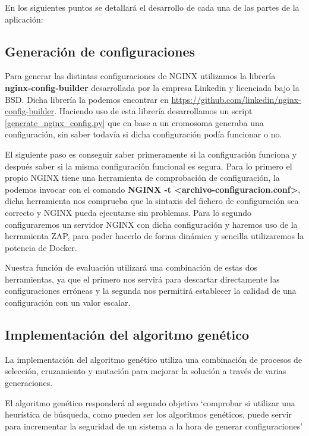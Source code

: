 En los siguientes puntos se detallará el desarrollo de cada una de las partes de la aplicación:

\subsection{Generación de configuraciones}

\bigskip
Para generar las distintas configuraciones de NGINX utilizamos la librería \textbf{nginx-config-builder} desarrollada por la empresa Linkedin y licenciada bajo la BSD. Dicha librería la podemos encontrar en \url{https://github.com/linkedin/nginx-config-builder}. Haciendo uso de esta librería desarrollamos un script \ref{generate_nginx_config.py} que en base a un cromosoma generaba una configuración, sin saber todavía si dicha configuración podía funcionar o no.

\bigskip
El siguiente paso es conseguir saber primeramente si la configuración funciona y después saber si la misma configuración funcional es segura. Para lo primero el propio NGINX tiene una herramienta de comprobación de configuración, la podemos invocar con el comando \textbf{NGINX -t <archivo-configuracion.conf>}, dicha herramienta nos comprueba que la sintaxis del fichero de configuración sea correcto y NGINX pueda ejecutarse sin problemas. Para lo segundo configuraremos un servidor NGINX con dicha configuración y haremos uso de la herramienta ZAP, para poder hacerlo de forma dinámica y sencilla utilizaremos la potencia de Docker.

\bigskip
Nuestra función de evaluación utilizará una combinación de estas dos herramientas, ya que el primero nos servirá para descartar directamente las configuraciones erróneas y la segunda nos permitirá establecer la calidad de una configuración con un valor escalar.

\subsection{Implementación del algoritmo genético}

La implementación del algoritmo genético utiliza una combinación de procesos de selección, cruzamiento y mutación para mejorar la solución a través de varias generaciones.

\bigskip
El algoritmo genético responderá al segundo objetivo `comprobar si utilizar una heurística de búsqueda, como pueden ser los algoritmos genéticos, puede servir para incrementar la seguridad de un sistema a la hora de generar configuraciones' 

